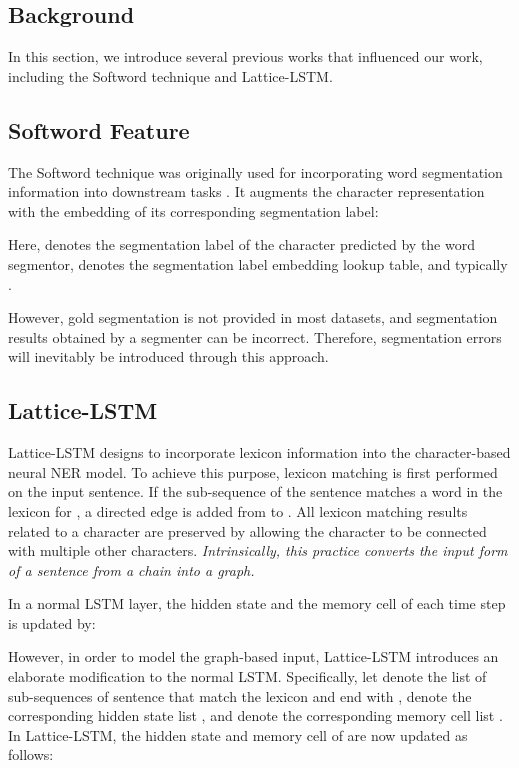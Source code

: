 \documentclass[11pt,a4paper]{article}
\begin{document}
\begin{CJK}{UTF8}{gbsn}
\section{Background}
In this section, we introduce several previous works that influenced our work, including the Softword technique and Lattice-LSTM.


\subsection{Softword Feature} 
The Softword technique was originally used for incorporating word segmentation information into downstream tasks \cite{zhao2008unsupervised,peng2016improving}. It augments the character representation with the embedding of its corresponding segmentation label: 

Here,  denotes the segmentation label of the character  predicted by the word segmentor,  denotes the segmentation label embedding lookup table, and typically .


However, gold segmentation is not provided in most datasets, and segmentation results obtained by a segmenter can be incorrect. Therefore, segmentation errors will inevitably be introduced through this approach.


\subsection{Lattice-LSTM}
Lattice-LSTM designs to incorporate lexicon information into the character-based neural NER model. To achieve this purpose, lexicon matching is first performed on the input sentence. If the sub-sequence  of the sentence matches a word in the lexicon for , a directed edge is added from  to . All lexicon matching results related to a character are preserved by allowing the character to be connected with multiple other characters. 
\textit{Intrinsically, this practice converts the input form of a sentence from a chain into a graph.}

In a normal LSTM layer, the hidden state  and the memory cell  of each time step is updated by:

However, in order to model the graph-based input, Lattice-LSTM introduces an elaborate modification to the normal LSTM. Specifically, let  denote the list of sub-sequences of sentence  that match the lexicon and end with ,  denote the corresponding hidden state list , and  denote the corresponding memory cell list . In Lattice-LSTM, the hidden state  and memory cell  of  are now updated as follows:


\end{CJK}
\end{document}
